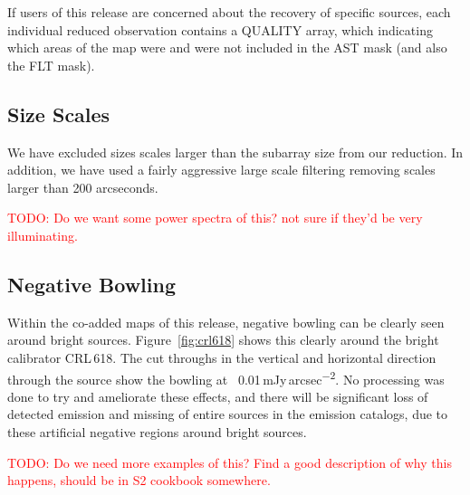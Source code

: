 \documentclass[twocolumn,times]{aastex6}
\newcommand{\todo}[1]{\textcolor{red}{TODO: #1}}
\newcommand{\jyas}{Jy\,arcsec\textsuperscript{$-$2}}
\begin{document}
If users of this release are concerned about the recovery of specific
sources, each individual reduced observation contains a QUALITY array,
which indicating which areas of the map were and were not included in
the AST mask (and also the FLT mask).


\subsection{Size Scales}
We have excluded sizes scales larger than the subarray size from our
reduction. In addition, we have used a fairly aggressive large scale
filtering removing scales larger than 200 arcseconds.

\todo{Do we want some power spectra of this? not sure if they'd be very illuminating.}

\subsection{Negative Bowling}
Within the co-added maps of this release, negative bowling can be
clearly seen around bright sources. Figure~\ref{fig:crl618} shows this
clearly around the bright calibrator CRL\,618. The cut throughs in the
vertical and horizontal direction through the source show the bowling
at ~0.01\,m\jyas. No processing was done to try and ameliorate these
effects, and there will be significant loss of detected emission and
missing of entire sources in the emission catalogs, due to these
artificial negative regions around bright sources.

\todo{Do we need more examples of this? Find a good description of why
  this happens, should be in S2 cookbook somewhere.}






\end{document}
